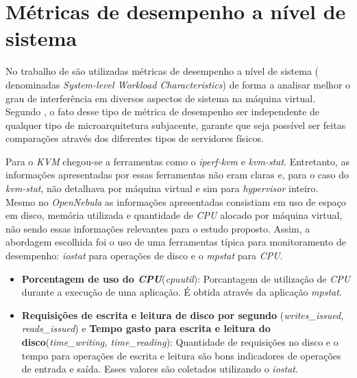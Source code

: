 \documentclass[[10pt,journal]{IEEEtran}
\begin{document}
\section{Métricas de desempenho a nível de sistema}
No trabalho de \cite{koh2007} são utilizadas métricas de desempenho a nível de sistema ( denominadas \textit{System-level Workload Characteristics}) de forma a analisar melhor o grau de interferência em diversos aspectos de sistema na máquina virtual. Segundo \cite{koh2007}, o fato desse tipo de métrica de desempenho ser independente de qualquer tipo de microarquitetura subjacente, garante que seja possível ser feitas comparações através dos diferentes tipos de servidores físicos.


Para o \textit{KVM} chegou-se a ferramentas como o \textit{iperf-kvm} e \textit{kvm-stat}. Entretanto, as informações apresentadas por essas ferramentas não eram claras e, para o caso do \textit{kvm-stat}, não detalhava por máquina virtual e sim para  \textit{hypervisor} inteiro. Mesmo no \textit{OpenNebula} as informações apresentadas consistiam em uso de espaço em disco, memória utilizada e quantidade de \textit{CPU} alocado por máquina virtual, não sendo essas informações relevantes para o estudo proposto. Assim, a abordagem escolhida foi o uso de uma ferramentas típica para monitoramento de desempenho: \textit{iostat} para operações de disco e o \textit{mpstat} para \textit{CPU}. %

\begin{itemize}
\item \textbf{Porcentagem de uso do \textit{CPU}}(\textit{cpuutil}): Porcantagem de utilização de \textit{CPU} durante a execução de uma aplicação. É obtida através da aplicação \textit{mpstat}.

\item \textbf{Requisições de escrita e leitura de disco por segundo }(\textit{writes\_issued, reads\_issued}) e \textbf{Tempo gasto para escrita e leitura do disco}(\textit{time\_writing, time\_reading}): Quantidade de requisições no disco e o tempo para operações de escrita e leitura são bons indicadores de operações de entrada e saída. Esses valores são coletados utilizando o \textit{iostat}.

\end{itemize}
\end{document}
